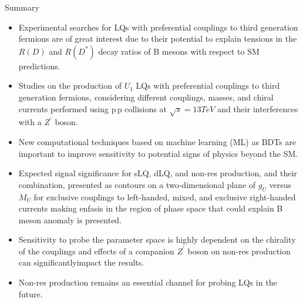 \documentclass{bredelebeamer}
\begin{document}
\begin{frame}{Summary}
	\begin{itemize}
		\item Experimental searches for LQs with preferential couplings to third generation fermions are of great interest due to their potential to explain tensions in the $R(D)$ and $R(D^{*})$ decay ratios of B mesons with respect to SM predictions. \vfill
		
		\item Studies on the production of $U_1$ LQs with preferential couplings to third generation fermions, considering different couplings, masses, and chiral currents performed using $\mathrm{p}\,\mathrm{p}$ collisions at $\sqrt{s} = 13TeV$ and their interferences with a $Z^{\prime}$ boson.  \vfill
		
		\item New computational techniques based on machine learning (ML) as BDTs are important to improve sensitivity to potential signs of physics beyond the SM. \vfill
		
		\item Expected signal significance for sLQ, dLQ, and non-res production, and their combination, presented as contours on a two-dimensional plane of $g_U$ versus $M_U$ for exclusive couplings to left-handed, mixed, and exclusive right-handed currents making enfasis in the region of phase space that could explain B meson anomaly is presented. \vfill

		\item Sensitivity to probe the parameter space is highly dependent on the chirality of the couplings and effects of a companion $Z^{\prime}$ boson on non-res production can significantlyimpact the results. \vfill
		
		\item Non-res production remains an essential channel for probing LQs in the future. \vfill
	\end{itemize}
	
\end{frame}

	
\end{document}
